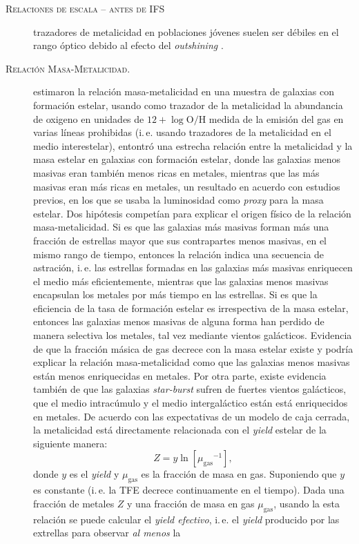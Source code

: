 \documentclass[xcolor=dvipsnames,4pt,hyperref={colorlinks,citecolor=black,linkcolor=black,urlcolor=black}]{beamer}
\begin{document}
\begin{frame}[allowframebreaks]{\textsc{Relaciones de escala -- antes de IFS}}
\begin{description}
trazadores de metalicidad en poblaciones jóvenes suelen ser débiles en el rango óptico debido al
efecto del \emph{outshining} \citep[e.\,g.][]{Conroy2013a}.
%
\item[\textsc{Relación Masa-Metalicidad.}] \citet{Tremonti2004} estimaron la relación
masa-metalicidad en una muestra de galaxias con formación estelar, usando como trazador de la
metalicidad la abundancia de oxigeno en unidades de $12+\log{\text{O}/\text{H}}$ medida de la
emisión del gas en varias líneas prohibidas (i.\,e. usando trazadores de la metalicidad en el medio
interestelar), entontró una estrecha relación entre la metalicidad y la masa estelar en galaxias con
formación estelar, donde las galaxias menos masivas eran también menos ricas en metales, mientras
que las más masivas eran más ricas en metales, un resultado en acuerdo con estudios previos, en los
que se usaba la luminosidad como \emph{proxy} para la masa estelar. Dos hipótesis competían para
explicar el origen físico de la relación masa-metalicidad. Si es que las galaxias más masivas forman
más una fracción de estrellas mayor que sus contrapartes menos masivas, en el mismo rango de tiempo,
entonces la relación indica una secuencia de astración, i.\,e. las estrellas formadas en las
galaxias más masivas enriquecen el medio más eficientemente, mientras que las galaxias menos masivas
encapsulan los metales por más tiempo en las estrellas. Si es que la eficiencia de la tasa de
formación estelar es irrespectiva de la masa estelar, entonces las galaxias menos masivas de alguna
forma han perdido de manera selectiva los metales, tal vez mediante vientos galácticos. Evidencia de
que la fracción másica de gas decrece con la masa estelar existe \citep{Bell2000} y podría explicar
la relación masa-metalicidad como que las galaxias menos masivas están menos enriquecidas en
metales. Por otra parte, existe evidencia también de que las galaxias \emph{star-burst} sufren de
fuertes vientos galácticos, que el medio intracúmulo y el medio intergaláctico están está
enriquecidos en metales.
%
De acuerdo con las expectativas de un modelo de caja cerrada, la metalicidad está directamente
relacionada con el \emph{yield} estelar de la siguiente manera:
%
$$
Z = y\ln{\left[{\mu_\text{gas}}^{-1}\right]},
$$
%
donde $y$ es el \emph{yield} y $\mu_\text{gas}$ es la fracción de masa en gas. Suponiendo que $y$ es
constante (i.\,e. la TFE decrece continuamente en el tiempo). Dada una fracción de metales $Z$ y una
fracción de masa en gas $\mu_\text{gas}$, usando la esta relación se puede calcular el \emph{yield
efectivo}, i.\,e. el \emph{yield} producido por las extrellas para observar \emph{al menos} la

\end{description}
\end{frame}
\end{document}
